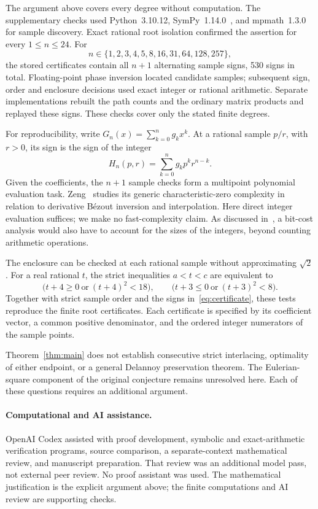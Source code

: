 \documentclass[11pt]{article}
\begin{document}
The argument above covers every degree without computation. The
supplementary checks used Python~3.10.12, SymPy~1.14.0~\cite{SymPy2017}, and
mpmath~1.3.0 for sample discovery. Exact rational root isolation confirmed
the assertion for every $1\leq n\leq24$. For
\[
 n\in\{1,2,3,4,5,8,16,31,64,128,257\},
\]
the stored certificates contain all $n+1$ alternating sample signs,
530 signs in total. Floating-point phase inversion located candidate
samples; subsequent sign, order and enclosure decisions used exact
integer or rational arithmetic. Separate implementations rebuilt the
path counts and the ordinary matrix products and replayed these signs.
These checks cover only the stated finite degrees.

For reproducibility, write $G_n(x)=\sum_{k=0}^n g_kx^k$. At a rational
sample $p/r$, with $r>0$, its sign is the sign of the integer
\begin{equation}\label{eq:certificate}
 H_n(p,r)=\sum_{k=0}^n g_kp^kr^{n-k}.
\end{equation}
Given the coefficients, the $n+1$ sample checks form a multipoint
polynomial evaluation task. Zeng~\cite{Zeng2026Evaluation}
studies its generic characteristic-zero complexity in relation to
derivative Bézout inversion and interpolation. Here direct integer
evaluation suffices; we make no fast-complexity claim. As discussed
in~\cite[Section~2.1]{Zeng2026Evaluation}, a bit-cost analysis would
also have to account for the sizes of the integers, beyond counting
arithmetic operations.

The enclosure can be checked at each rational sample without approximating
$\sqrt2$. For a real rational $t$, the strict inequalities $a<t<c$ are
equivalent to
\[
 \bigl(t+4\geq0\ \text{or}\ (t+4)^2<18\bigr),\qquad
 \bigl(t+3\leq0\ \text{or}\ (t+3)^2<8\bigr).
\]
Together with strict sample order and the signs in~\eqref{eq:certificate},
these tests reproduce the finite root certificates. Each certificate is
specified by its coefficient vector, a common positive denominator,
and the ordered integer numerators of the sample points.

Theorem~\ref{thm:main} does not establish consecutive strict interlacing,
optimality of either endpoint, or a general Delannoy preservation theorem.
The Eulerian-square component of the original conjecture remains
unresolved here. Each of these questions requires an additional argument.

\paragraph{Computational and AI assistance.}
OpenAI Codex assisted with proof development, symbolic and exact-arithmetic
verification programs, source comparison, a separate-context mathematical
review, and manuscript preparation. That review was an additional model
pass, not external peer review. No proof assistant was used. The mathematical
justification is the explicit argument above; the finite computations and
AI review are supporting checks.



\end{document}

